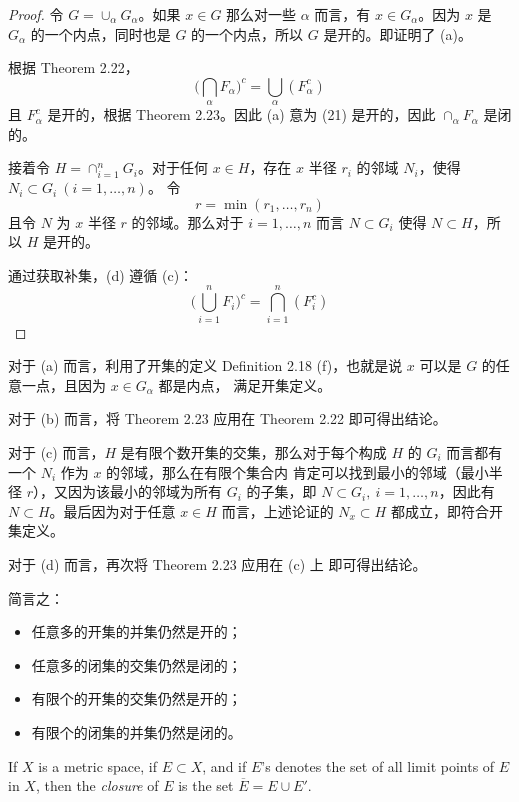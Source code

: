 \documentclass[../poma-notes.tex]{subfiles}
\begin{document}
\begin{proof}
  令 $G=\cup_{\alpha}G_{\alpha}$。如果 $x \in G$ 那么对一些 $\alpha$ 而言，有 $x \in G_{\alpha}$。因为 $x$ 是 $G_{\alpha}$
  的一个内点，同时也是 $G$ 的一个内点，所以 $G$ 是开的。即证明了 (a)。

  根据 Theorem 2.22，
  \begin{equation}
    \biggl(\bigcap\limits_{\alpha}F_{\alpha}\biggr)^c = \bigcup\limits_{\alpha}(F_{\alpha}^c)
  \end{equation}
  且 $F_{\alpha}^c$ 是开的，根据 Theorem 2.23。因此 (a) 意为 (21) 是开的，因此 $\cap_{\alpha}F_{\alpha}$ 是闭的。

  接着令 $H=\cap_{i=1}^n G_i$。对于任何 $x \in H$，存在 $x$ 半径 $r_i$ 的邻域 $N_i$，使得 $N_i \subset G_i \ (i=1,\dots,n)$。
  令
  \[r=\min(r_1,\dots,r_n)\]
  且令 $N$ 为 $x$ 半径 $r$ 的邻域。那么对于 $i=1,\dots,n$ 而言 $N \subset G_i$ 使得 $N \subset H$，所以 $H$ 是开的。

  通过获取补集，(d) 遵循 (c)：
  \[\biggl(\bigcup\limits_{i=1}^n F_i\biggr)^c = \bigcap\limits_{i=1}^n(F_i^c)\]
\end{proof}

\begin{anote}
  对于 (a) 而言，利用了开集的定义 Definition 2.18 (f)，也就是说 $x$ 可以是 $G$ 的任意一点，且因为 $x \in G_{\alpha}$ 都是内点，
  满足开集定义。

  对于 (b) 而言，将 Theorem 2.23 应用在 Theorem 2.22 即可得出结论。

  对于 (c) 而言，$H$ 是有限个数开集的交集，那么对于每个构成 $H$ 的 $G_i$ 而言都有一个 $N_i$ 作为 $x$ 的邻域，那么在有限个集合内
  肯定可以找到最小的邻域（最小半径 $r$），又因为该最小的邻域为所有 $G_i$ 的子集，即 $N \subset G_i, \ i=1,\dots,n$，因此有
  $N \subset H$。最后因为对于任意 $x \in H$ 而言，上述论证的 $N_x \subset H$ 都成立，即符合开集定义。

  对于 (d) 而言，再次将 Theorem 2.23 应用在 (c) 上 即可得出结论。

  简言之：
  \begin{itemize}
    \item 任意多的开集的并集仍然是开的；
    \item 任意多的闭集的交集仍然是闭的；
    \item 有限个的开集的交集仍然是开的；
    \item 有限个的闭集的并集仍然是闭的。
  \end{itemize}
\end{anote}

\begin{definition}
  If $X$ is a metric space, if $E \subset X$, and if $E$'s denotes the set of all limit points of $E$ in $X$, then the
  \textit{closure} of $E$ is the set $\overline{E} = E \cup E'$.
\end{definition}
\end{document}
